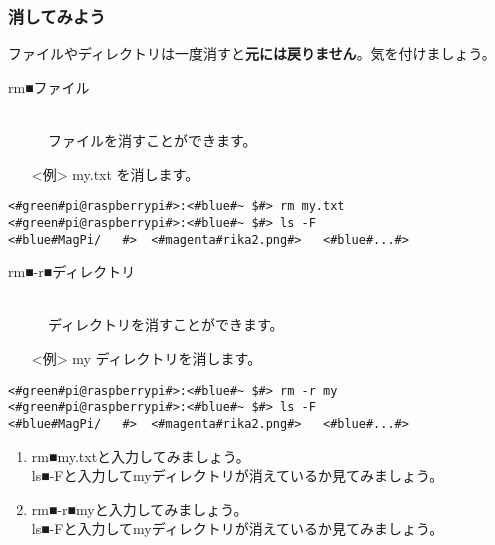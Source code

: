 \subsubsection{消してみよう}
ファイルやディレクトリは一度消すと\textbf{元には戻りません}。気を付けましょう。
\begin{description}
\item[rm■ファイル]\mbox{}\\
ファイルを消すことができます。
\end{description}
\begin{itemize}
\item[<例>]my.txt を消します。
\end{itemize}
\begin{lstlisting}[caption=cpの例, label=cp]
<#green#pi@raspberrypi#>:<#blue#~ $#> rm my.txt
<#green#pi@raspberrypi#>:<#blue#~ $#> ls -F
<#blue#MagPi/	#>	<#magenta#rika2.png#>	<#blue#...#>
\end{lstlisting}
\begin{description}
\item[rm■-r■ディレクトリ]\mbox{}\\
ディレクトリを消すことができます。
\end{description}
\begin{itemize}
\item[<例>]my ディレクトリを消します。
\end{itemize}
\begin{lstlisting}[caption=cp -rの例, label=cp-R]
<#green#pi@raspberrypi#>:<#blue#~ $#> rm -r my
<#green#pi@raspberrypi#>:<#blue#~ $#> ls -F
<#blue#MagPi/	#>	<#magenta#rika2.png#>	<#blue#...#>
\end{lstlisting}
\begin{tcolorbox}[title=\useOmetoi]
\begin{enumerate}
\item rm■my.txtと入力してみましょう。\\ls■-Fと入力してmyディレクトリが消えているか見てみましょう。\\
\item rm■-r■myと入力してみましょう。\\ls■-Fと入力してmyディレクトリが消えているか見てみましょう。\\
\end{enumerate}
\end{tcolorbox}

